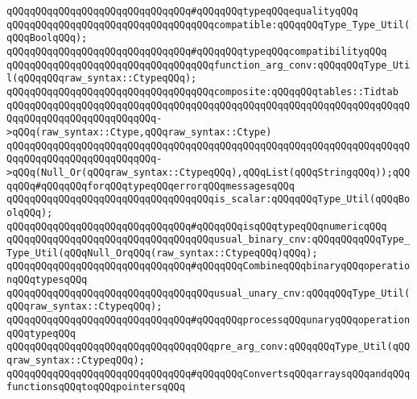 \verb|qQQqqQQqqQQqqQQqqQQqqQQqqQQqqQQq#qQQqqQQqtypeqQQqequalityqQQq|\newline
\newline
\verb|qQQqqQQqqQQqqQQqqQQqqQQqqQQqqQQqqQQqcompatible:qQQqqQQqType_Type_Util(qQQqBoolqQQq);|\newline
\verb|qQQqqQQqqQQqqQQqqQQqqQQqqQQqqQQq#qQQqqQQqtypeqQQqcompatibilityqQQq|\newline
\newline
\verb|qQQqqQQqqQQqqQQqqQQqqQQqqQQqqQQqqQQqfunction_arg_conv:qQQqqQQqType_Util(qQQqqQQqraw_syntax::CtypeqQQq);|\newline
\newline
\verb|qQQqqQQqqQQqqQQqqQQqqQQqqQQqqQQqqQQqcomposite:qQQqqQQqtables::Tidtab|\newline
\verb|qQQqqQQqqQQqqQQqqQQqqQQqqQQqqQQqqQQqqQQqqQQqqQQqqQQqqQQqqQQqqQQqqQQqqQQqqQQqqQQqqQQqqQQqqQQqqQQq->qQQq(raw_syntax::Ctype,qQQqraw_syntax::Ctype)|\newline
\verb|qQQqqQQqqQQqqQQqqQQqqQQqqQQqqQQqqQQqqQQqqQQqqQQqqQQqqQQqqQQqqQQqqQQqqQQqqQQqqQQqqQQqqQQqqQQqqQQq->qQQq(Null_Or(qQQqraw_syntax::CtypeqQQq),qQQqList(qQQqStringqQQq));qQQqqQQq#qQQqqQQqforqQQqtypeqQQqerrorqQQqmessagesqQQq|\newline
\newline
\verb|qQQqqQQqqQQqqQQqqQQqqQQqqQQqqQQqqQQqis_scalar:qQQqqQQqType_Util(qQQqBoolqQQq);|\newline
\verb|qQQqqQQqqQQqqQQqqQQqqQQqqQQqqQQq#qQQqqQQqisqQQqtypeqQQqnumericqQQq|\newline
\newline
\verb|qQQqqQQqqQQqqQQqqQQqqQQqqQQqqQQqqQQqusual_binary_cnv:qQQqqQQqqQQqType_Type_Util(qQQqNull_OrqQQq(raw_syntax::CtypeqQQq)qQQq);|\newline
\verb|qQQqqQQqqQQqqQQqqQQqqQQqqQQqqQQq#qQQqqQQqCombineqQQqbinaryqQQqoperationqQQqtypesqQQq|\newline
\newline
\verb|qQQqqQQqqQQqqQQqqQQqqQQqqQQqqQQqqQQqusual_unary_cnv:qQQqqQQqType_Util(qQQqraw_syntax::CtypeqQQq);|\newline
\verb|qQQqqQQqqQQqqQQqqQQqqQQqqQQqqQQq#qQQqqQQqprocessqQQqunaryqQQqoperationqQQqtypeqQQq|\newline
\newline
\verb|qQQqqQQqqQQqqQQqqQQqqQQqqQQqqQQqqQQqpre_arg_conv:qQQqqQQqType_Util(qQQqraw_syntax::CtypeqQQq);|\newline
\verb|qQQqqQQqqQQqqQQqqQQqqQQqqQQqqQQq#qQQqqQQqConvertsqQQqarraysqQQqandqQQqfunctionsqQQqtoqQQqpointersqQQq|\newline

